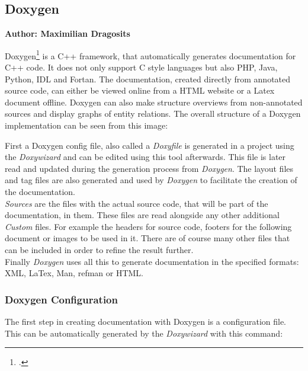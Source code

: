 \subsection{Doxygen}
\textbf{Author: Maximilian Dragosits}

Doxygen\footcite{doxygen_main_site} is a C++ framework, that automatically generates documentation for C++ code. It does not only support C style languages but also 
PHP, Java, Python, IDL and Fortan. The documentation, created directly from annotated source code, can either be viewed online from a HTML website or a Latex document
offline. Doxygen can also make structure overviews from non-annotated sources and display graphs of entity relations. The overall structure of a Doxygen implementation
can be seen from this image:\\
\vspace{2mm}

First a Doxygen config file, also called a \textit{Doxyfile} is generated in a project using the \textit{Doxywizard} and can be edited using this tool afterwards. 
This file is later read and updated during the generation process from \textit{Doxygen}. The layout files and tag files are also generated and used by \textit{Doxygen}
to facilitate the creation of the documentation.\\
\vspace{\baselineskip}
\textit{Sources} are the files with the actual source code, that will be part of the documentation, in them. These files are read alongside any other additional \textit{Custom}
files. For example the headers for source code, footers for the following document or images to be used in it. There are of course many other files that can be included
in order to refine the result further.\\
\vspace{\baselineskip}
Finally \textit{Doxygen} uses all this to generate documentation in the specified formats: XML, LaTex, Man, refman or HTML. \\

\subsubsection{Doxygen Configuration}
The first step in creating documentation with Doxygen is a configuration file. This can be automatically generated by the \textit{Doxywizard} with this command:

